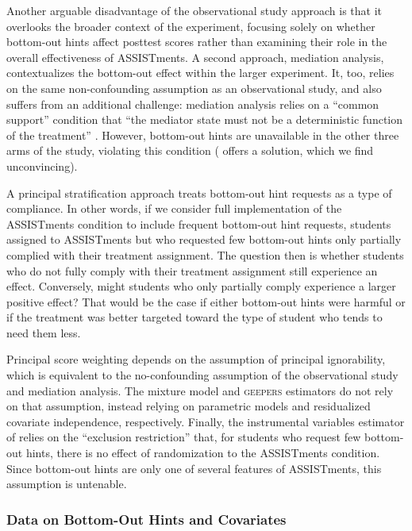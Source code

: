 \documentclass[]{article}
\begin{document}
Another arguable disadvantage of the observational study approach is that it overlooks the broader context of the experiment, focusing solely on whether bottom-out hints affect posttest scores rather than examining their role in the overall effectiveness of ASSISTments.
A second approach, mediation analysis, contextualizes the bottom-out effect within the larger experiment.
It, too, relies on the same non-confounding assumption as an observational study, and also suffers from an additional challenge: mediation analysis relies on a ``common support'' condition that ``the mediator state must not be a deterministic function of the treatment'' \citep[p. 225]{celli2022causal}.
However, bottom-out hints are unavailable in the other three arms of the study, violating this condition (\citealt{sales2021student} offers a solution, which we find unconvincing).

A principal stratification approach treats bottom-out hint requests as a type of compliance.
In other words, if we consider full implementation of the ASSISTments condition to include frequent bottom-out hint requests, students assigned to ASSISTments but who requested few bottom-out hints only partially complied with their treatment assignment.
The question then is whether students who do not fully comply with their treatment assignment still experience an effect.
Conversely, might students who only partially comply experience a larger positive effect?
That would be the case if either bottom-out hints were harmful or if the treatment was better targeted toward the type of student who tends to need them less.

Principal score weighting depends on the assumption of principal ignorability, which is equivalent to the no-confounding assumption of the observational study and mediation analysis.
The mixture model and \textsc{geepers} estimators do not rely on that assumption, instead relying on parametric models and residualized covariate independence, respectively.
Finally, the instrumental variables estimator of \citet{air} relies on the ``exclusion restriction'' that, for students who request few bottom-out hints, there is no effect of randomization to the ASSISTments condition.
Since bottom-out hints are only one of several features of ASSISTments, this assumption is untenable. 


\subsubsection{Data on Bottom-Out Hints and Covariates}
\end{document}
